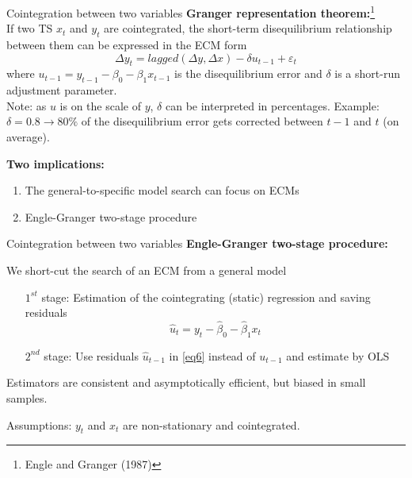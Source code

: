 \documentclass{beamer}
\begin{document}

\begin{frame}{Cointegration between two variables}
\textbf{Granger representation theorem:}\footnote{Engle and Granger (1987)}\\
If two TS $x_t$ and $y_t$ are cointegrated, the short-term disequilibrium relationship between them can be expressed in the ECM form
\vspace{-0.2cm}
\begin{equation} \label{eq6}
 \Delta y_t = lagged(\Delta y, \Delta x) - \delta u_{t-1} + \varepsilon_t 
\end{equation}
where $u_{t-1} = y_{t-1} - \beta_0 - \beta_1 x_{t-1}$ is the disequilibrium error and $\delta$ is a short-run adjustment parameter. \\
\footnotesize{Note: as $u$ is on the scale of $y$, $\delta$ can be interpreted in percentages. Example: $\delta = 0.8 \rightarrow 80 \%$ of the disequilibrium error gets corrected between $t-1$ and $t$ (on average).}
\vspace{0.1cm}

\textbf{Two implications:}
\begin{enumerate}
\item The general-to-specific model search can focus on ECMs
\item Engle-Granger two-stage procedure
\end{enumerate}
\end{frame}


\begin{frame}{Cointegration between two variables}
\textbf{Engle-Granger two-stage procedure:}

\medskip
We short-cut the search of an ECM from a general model
\begin{itemize}
\item[ $1^{st}$ ]  stage: Estimation of the cointegrating (static) regression and saving residuals $$\hat{u}_t = y_t - \hat{\beta}_0 - \hat{\beta}_1 x_t$$
\item [$2^{nd}$]  stage: Use residuals $\hat{u}_{t-1}$ in \eqref{eq6} instead of $u_{t-1}$ and estimate by OLS
\end{itemize}
Estimators are consistent and asymptotically efficient, but biased in small samples. 

\medskip
\small{Assumptions: $y_t$ and $x_t$ are non-stationary and cointegrated.}
\end{frame}
\end{document}
